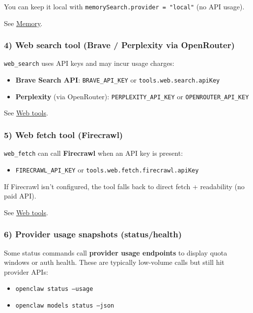 You can keep it local with \texttt{memorySearch.provider = "local"} (no API usage).

See \href{/concepts/memory}{Memory}.

\subsubsection{4) Web search tool (Brave / Perplexity via OpenRouter)}


\texttt{web\_search} uses API keys and may incur usage charges:

\begin{itemize}
  \item \textbf{Brave Search API}: \texttt{BRAVE\_API\_KEY} or \texttt{tools.web.search.apiKey}
  \item \textbf{Perplexity} (via OpenRouter): \texttt{PERPLEXITY\_API\_KEY} or \texttt{OPENROUTER\_API\_KEY}
\end{itemize}


See \href{/tools/web}{Web tools}.

\subsubsection{5) Web fetch tool (Firecrawl)}


\texttt{web\_fetch} can call \textbf{Firecrawl} when an API key is present:

\begin{itemize}
  \item \texttt{FIRECRAWL\_API\_KEY} or \texttt{tools.web.fetch.firecrawl.apiKey}
\end{itemize}


If Firecrawl isn’t configured, the tool falls back to direct fetch + readability (no paid API).

See \href{/tools/web}{Web tools}.

\subsubsection{6) Provider usage snapshots (status/health)}


Some status commands call \textbf{provider usage endpoints} to display quota windows or auth health.
These are typically low-volume calls but still hit provider APIs:

\begin{itemize}
  \item \texttt{openclaw status --usage}
  \item \texttt{openclaw models status --json}
\end{itemize}


